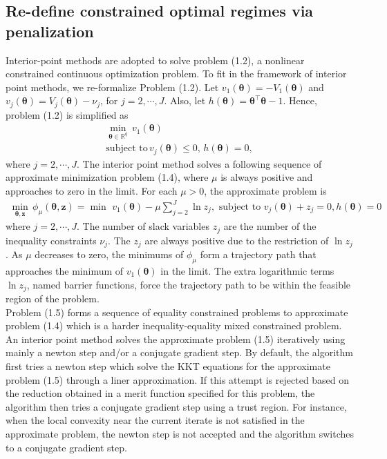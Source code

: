\documentclass[12pt]{article}
\newcommand{\itl}{\intercal}
\newcommand{\bs}{ \boldsymbol}
\newcommand{\mb}{\mathbb}
\newcommand{\lt}{\left}
\newcommand{\rt}{\right}
\begin{document}
\subsection{Re-define constrained optimal regimes  via penalization} %
Interior-point methods are adopted to solve problem (1.2), a nonlinear constrained continuous optimization problem. To fit in the framework of interior point methods, we re-formalize Problem (1.2). Let $v_1\lt(\bs{\theta}\rt)=- V_1\lt(\bs{\theta}\rt)$ and  $v_j\lt(\bs{\theta}\rt) = V_j\lt(\bs{\theta}\rt) - \nu_j$, for $j = 2, \cdots, J$. Also, let $h\lt(\bs{\theta}\rt) = \bs{\theta}^{\itl}\bs{\theta}-1$. Hence,  problem (1.2) is simplified as
\begin{equation}
\begin{gathered}
\min_{\bs{\theta} \in \mb{R}^q} \, v_1(\bs{\theta}) \\ 
\text{subject to}  \, v_j(\bs{\theta}) \le 0,\, h\lt(\bs{\theta}\rt)=0,
\end{gathered}
\end{equation}
where  $j = 2, \cdots, J$. The interior point method solves a following sequence of approximate minimization problem (1.4), where $\mu$ is always positive and approaches to zero in the limit. For each $\mu >0$, the approximate problem is 
\begin{equation}
\begin{gathered}
\min_{\bs{\theta}, \bs{z}} \, \phi_{\mu}(\bs{\theta}, \bs{z}) = \min \,\,v_1(\bs{\theta}) - \mu \sum_{j=2}^J \ln z_j, \text{ subject to } v_j(\bs{\theta})  + z_j = 0, h\lt(\bs{\theta}\rt) = 0
\end{gathered}
\end{equation}
where  $j = 2, \cdots, J$. The number of slack variables $z_j$ are the number of the inequality constraints $\nu_j$. The $z_j$ are always positive due to the restriction of $\ln z_j$. As $\mu$ decreases to zero, the minimums of $\phi_\mu$ form a trajectory path that approaches the minimum of $v_1(\bs{\theta})$ in the limit. The extra logarithmic terms $\ln z_j$, named barrier functions, force the trajectory path to be within the feasible region of the problem.\\

Problem (1.5) forms a sequence of equality constrained problems to approximate problem (1.4) which is a harder inequality-equality mixed constrained problem. An interior point method solves the approximate problem (1.5) iteratively using mainly a newton step and/or a conjugate gradient step. By default, the algorithm first tries a newton step which solve the KKT equations for the approximate problem (1.5) through a liner approximation. If this attempt is rejected based on the reduction obtained in a merit function specified for this problem, the algorithm then tries a conjugate gradient step using a trust region. For instance, when the local convexity near the current iterate is not satisfied in the approximate problem, the newton step is not accepted and the algorithm switches to a conjugate gradient step. 
\end{document}
